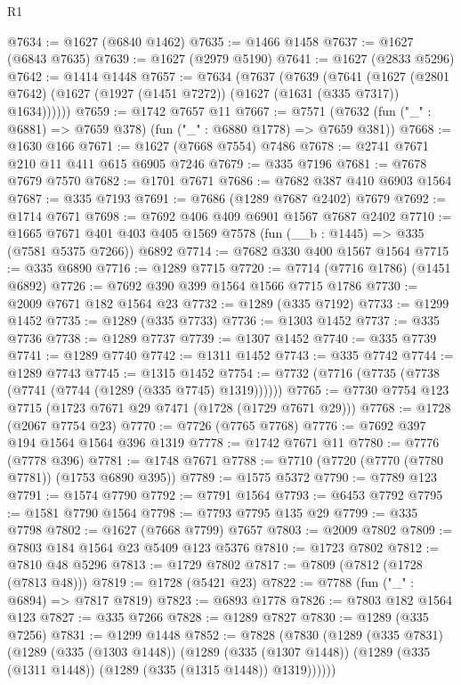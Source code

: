 \begin{lexlean}{R1}
\begin{coremodule}
@7634 := @1627 (@6840 @1462)
@7635 := @1466 @1458
@7637 := @1627 (@6843 @7635)
@7639 := @1627 (@2979 @5190)
@7641 := @1627 (@2833 @5296)
@7642 := @1414 @1448
@7657 := @7634
    (@7637
      (@7639
        (@7641
          (@1627 (@2801 @7642) (@1627 (@1927 (@1451 @7272)) (@1627 (@1631 (@335 @7317)) @1634))))))
@7659 := @1742 @7657 @11
@7667 := @7571 (@7632 (fun ("_" : @6881) => @7659 @378) (fun ("_" : @6880 @1778) => @7659 @381))
@7668 := @1630 @166
@7671 := @1627 (@7668 @7554) @7486
@7678 := @2741 @7671 @210 @11 @411 @615 @6905 @7246
@7679 := @335 @7196
@7681 := @7678 @7679 @7570
@7682 := @1701 @7671
@7686 := @7682 @387 @410 @6903 @1564
@7687 := @335 @7193
@7691 := @7686 (@1289 @7687 @2402) @7679
@7692 := @1714 @7671
@7698 := @7692 @406 @409 @6901 @1567 @7687 @2402
@7710 := @1665
    @7671
    @401
    @403
    @405
    @1569
    @7578
    (fun (__b : @1445) => @335 (@7581 @5375 @7266))
    @6892
@7714 := @7682 @330 @400 @1567 @1564
@7715 := @335 @6890
@7716 := @1289 @7715
@7720 := @7714 (@7716 @1786) (@1451 @6892)
@7726 := @7692 @390 @399 @1564 @1566 @7715 @1786
@7730 := @2009 @7671 @182 @1564 @23
@7732 := @1289 (@335 @7192)
@7733 := @1299 @1452
@7735 := @1289 (@335 @7733)
@7736 := @1303 @1452
@7737 := @335 @7736
@7738 := @1289 @7737
@7739 := @1307 @1452
@7740 := @335 @7739
@7741 := @1289 @7740
@7742 := @1311 @1452
@7743 := @335 @7742
@7744 := @1289 @7743
@7745 := @1315 @1452
@7754 := @7732 (@7716 (@7735 (@7738 (@7741 (@7744 (@1289 (@335 @7745) @1319))))))
@7765 := @7730 @7754 @123 @7715 (@1723 @7671 @29 @7471 (@1728 (@1729 @7671 @29)))
@7768 := @1728 (@2067 @7754 @23)
@7770 := @7726 (@7765 @7768)
@7776 := @7692 @397 @194 @1564 @1564 @396 @1319
@7778 := @1742 @7671 @11
@7780 := @7776 (@7778 @396)
@7781 := @1748 @7671
@7788 := @7710 (@7720 (@7770 (@7780 @7781)) (@1753 @6890 @395))
@7789 := @1575 @5372
@7790 := @7789 @123
@7791 := @1574 @7790
@7792 := @7791 @1564
@7793 := @6453 @7792
@7795 := @1581 @7790 @1564
@7798 := @7793 @7795 @135 @29
@7799 := @335 @7798
@7802 := @1627 (@7668 @7799) @7657
@7803 := @2009 @7802
@7809 := @7803 @184 @1564 @23 @5409 @123 @5376
@7810 := @1723 @7802
@7812 := @7810 @48 @5296
@7813 := @1729 @7802
@7817 := @7809 (@7812 (@1728 (@7813 @48)))
@7819 := @1728 (@5421 @23)
@7822 := @7788 (fun ("_" : @6894) => @7817 @7819)
@7823 := @6893 @1778
@7826 := @7803 @182 @1564 @123
@7827 := @335 @7266
@7828 := @1289 @7827
@7830 := @1289 (@335 @7256)
@7831 := @1299 @1448
@7852 := @7828
    (@7830
      (@1289
        (@335 @7831)
        (@1289
          (@335 (@1303 @1448))
          (@1289
            (@335 (@1307 @1448))
            (@1289 (@335 (@1311 @1448)) (@1289 (@335 (@1315 @1448)) @1319))))))

\end{coremodule}
\end{lexlean}
